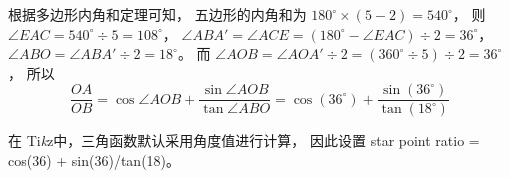 \documentclass[UTF8]{ctexart}
\def\spratio{cos(36) + sin(36)/tan(18)}
\newcommand{\tikzprint}{Ti\emph{k}z}
\begin{document}
根据多边形内角和定理可知，
五边形的内角和为 $180^\circ \times (5 - 2) = 540^\circ$，
则 $\angle EAC = 540^\circ \div 5 = 108^\circ$，
$\angle ABA' = \angle ACE = (180^\circ - \angle EAC) \div 2 = 36^\circ$，
$\angle ABO = \angle ABA' \div 2 = 18^\circ$。
而 $\angle AOB = \angle AOA' \div 2 = (360^\circ \div 5) \div 2 = 36^\circ$，
所以
\[ \frac{OA}{OB} = \cos \angle AOB + \frac{\sin \angle AOB}{\tan \angle ABO}
                 = \cos(36^\circ) + \frac{\sin(36^\circ)}{\tan(18^\circ)} \]

在 \tikzprint 中，三角函数默认采用角度值进行计算，
因此设置 star point ratio = \spratio 。
\end{document}
